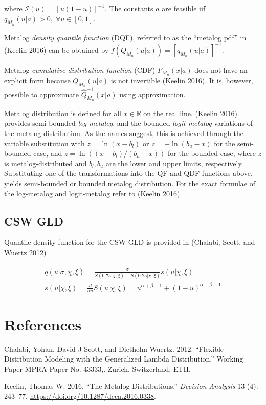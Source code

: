 \documentclass[
  letterpaper,
  DIV=11,
  numbers=noendperiod]{scrartcl}
\newlength{\cslhangindent}
\newenvironment{CSLReferences}[2] %
 {\begin{list}{}{%
  \setlength{\itemindent}{0pt}
  \setlength{\leftmargin}{0pt}
  \setlength{\parsep}{0pt}
  \ifodd #1
   \setlength{\leftmargin}{\cslhangindent}
   \setlength{\itemindent}{-1\cslhangindent}
  \fi
  \setlength{\itemsep}{#2\baselineskip}}}
 {\end{list}}
\begin{document}
where \(\mathcal I(u)=[u(1-u)]^{-1}\). The constants \(a\) are feasible
iif \(q_{M_{n}}(u\vert a)>0, \;\forall u \in [0,1]\).

Metalog \emph{density quantile function} (DQF), referred to as the
``metalog pdf'' in (Keelin 2016) can be obtained by
\(f(Q_{M_n}(u\vert a))=[q_{M_n}(u\vert a)]^{-1}\).

Metalog \emph{cumulative distribution function} (CDF)
\(F_{M_n}(x\vert a)\) does not have an explicit form because
\(Q_{M_n}(u\vert a)\) is not invertible (Keelin 2016). It is, however,
possible to approximate \(\widehat Q^{-1}_{M_n}(x\vert a)\) using
approximation.

Metalog distribution is defined for all \(x \in \mathbb R\) on the real
line. (Keelin 2016) provides semi-bounded \emph{log-metalog}, and the
bounded \emph{logit-metalog} variations of the metalog distribution. As
the names suggest, this is achieved through the variable substitution
with \(z=\ln(x-b_l)\) or \(z=-\ln(b_u-x)\) for the semi-bounded case,
and \(z=\ln((x-b_l)/(b_u-x))\) for the bounded case, where \(z\) is
metalog-distributed and \(b_l, b_u\) are the lower and upper limits,
respectively. Substituting one of the transformations into the QF and
QDF functions above, yields semi-bounded or bounded metalog
distribution. For the exact formulae of the log-metalog and
logit-metalog refer to (Keelin 2016).

\subsection*{CSW GLD}\label{csw-gld}

Quantile density function for the CSW GLD is provided in (Chalabi,
Scott, and Wuertz 2012)

\[
\begin{gathered}
q(u\vert\tilde\sigma,\chi,\xi)= \frac{\tilde\sigma}{S(0.75\vert\chi,\xi)-S(0.25\vert\chi,\xi)}
s(u\vert\chi,\xi) \\
s(u\vert\chi,\xi)=\frac{d}{du}S(u\vert\chi,\xi)=u^{\alpha+\beta-1}+(1-u)^{\alpha-\beta-1}
\end{gathered}
\]

\section*{References}\label{references}

\label{refs}
\begin{CSLReferences}{1}{0}
Chalabi, Yohan, David J Scott, and Diethelm Wuertz. 2012. {``Flexible
Distribution Modeling with the Generalized Lambda Distribution.''}
Working Paper MPRA Paper No. 43333,. Zurich, Switzerland: ETH.

Keelin, Thomas W. 2016. {``The {Metalog Distributions}.''}
\emph{Decision Analysis} 13 (4): 243--77.
\url{https://doi.org/10.1287/deca.2016.0338}.

\end{CSLReferences}
\end{document}
